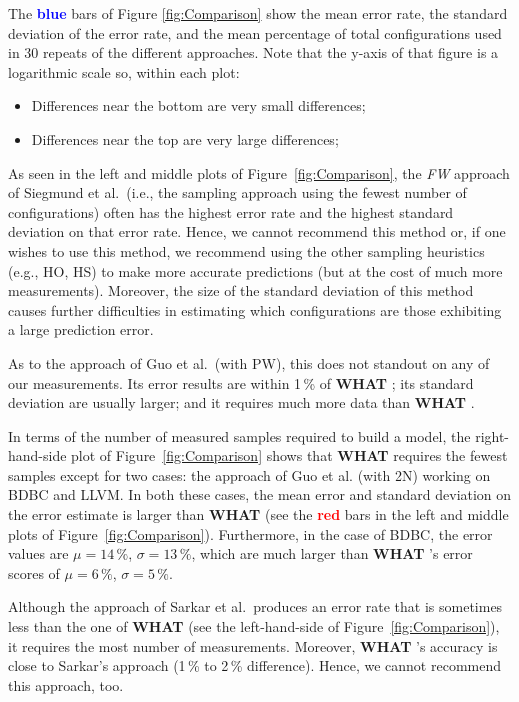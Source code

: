 \documentclass{newsig}
\newcommand{\what}{{\bf WHAT }}
\begin{document}
 The \textcolor{blue}{\bf blue} bars of Figure \ref{fig:Comparison} show the
 mean error rate, the standard deviation of the error rate, and the mean percentage
 of total configurations used in 30 repeats of the different approaches.
 Note that the y-axis of that figure is a logarithmic scale so, within each plot:
 \begin{itemize}
 \item Differences near the bottom  are very small differences;
 \item Differences near the top   are very large differences;
 \end{itemize}
 
As seen in the left and middle plots of
Figure~\ref{fig:Comparison}, 
the {\em FW} approach of Siegmund et al.\ (i.e., the sampling approach using the fewest number of configurations) often has the highest
error rate and the highest
standard deviation on that error rate. Hence,
we cannot recommend this method or,  if one wishes to use this method, we recommend using the other sampling heuristics (e.g., HO, HS) to make more accurate predictions (but at the cost of much more measurements). Moreover, the size of the standard deviation of this method causes further difficulties in estimating which configurations are those exhibiting a large prediction error. 

As to the approach of Guo et al.\ (with PW), this   does not standout on any of
our measurements. Its error results are within 1\,\% of \what;
 its standard deviation are usually larger; and it requires
 much more data than \what.
 
 In terms of the number of measured samples required to build a model, 
 the right-hand-side plot of  Figure~\ref{fig:Comparison}  shows that
 \what requires the fewest samples except for two cases:
 the approach of Guo et al. (with 2N) working on BDBC and LLVM.  In both these cases, the mean error and standard deviation on the error
 estimate is   larger than \what  (see the \textcolor{red}{{\bf red}} bars in the left and middle plots   of Figure~\ref{fig:Comparison}). Furthermore, in the case of BDBC, the error values
 are $\mu=14\,\%$, $\sigma=13\,\%$, which are much larger
than \what{}'s error scores of $\mu=6\,\%$, $\sigma=5\,\%$. 


Although the approach of Sarkar et al.\ produces an error rate that is sometimes less than the one of \what (see the left-hand-side of
Figure~\ref{fig:Comparison}), it requires the most number of measurements. Moreover, \what's accuracy is close to Sarkar's approach (1\,\%
to 2\,\% difference). Hence, we cannot recommend this approach, too.
\end{document}
